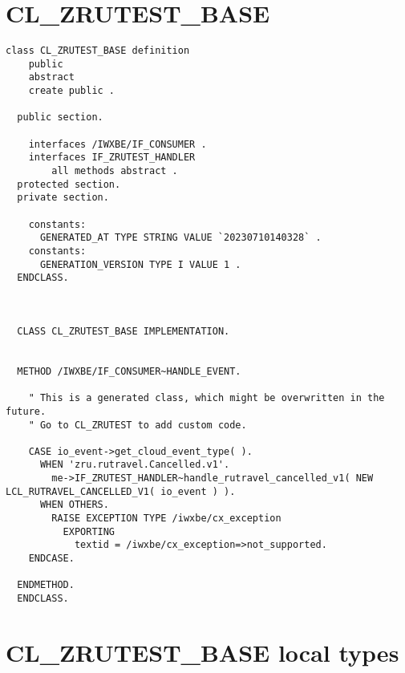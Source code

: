\section*{ CL\_ZRUTEST\_BASE } 

\begin{Verbatim}[breaklines=true]
    class CL_ZRUTEST_BASE definition
    public
    abstract
    create public .
  
  public section.
  
    interfaces /IWXBE/IF_CONSUMER .
    interfaces IF_ZRUTEST_HANDLER
        all methods abstract .
  protected section.
  private section.
  
    constants:
      GENERATED_AT TYPE STRING VALUE `20230710140328` .
    constants:
      GENERATION_VERSION TYPE I VALUE 1 .
  ENDCLASS.
  
  
  
  CLASS CL_ZRUTEST_BASE IMPLEMENTATION.
  
  
  METHOD /IWXBE/IF_CONSUMER~HANDLE_EVENT.
  
    " This is a generated class, which might be overwritten in the future.
    " Go to CL_ZRUTEST to add custom code.
  
    CASE io_event->get_cloud_event_type( ).
      WHEN 'zru.rutravel.Cancelled.v1'.
        me->IF_ZRUTEST_HANDLER~handle_rutravel_cancelled_v1( NEW LCL_RUTRAVEL_CANCELLED_V1( io_event ) ).
      WHEN OTHERS.
        RAISE EXCEPTION TYPE /iwxbe/cx_exception
          EXPORTING
            textid = /iwxbe/cx_exception=>not_supported.
    ENDCASE.
  
  ENDMETHOD.
  ENDCLASS.
\end{Verbatim}

\section*{ CL\_ZRUTEST\_BASE local types} 

